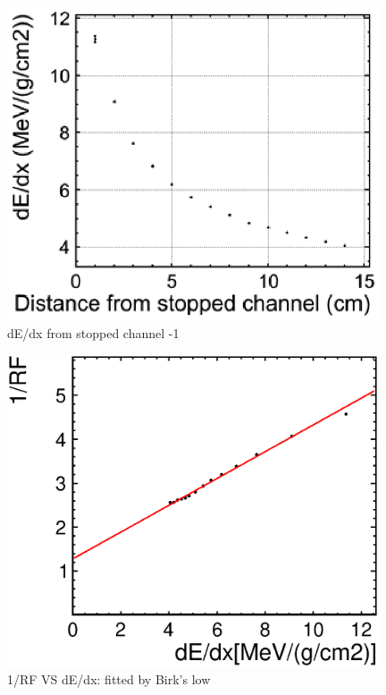 \begin{figure}[!htb]
  \centering
  \centering
  \includegraphics[width=11cm,clip]{./fig/dedx.eps}
  \caption{dE/dx from stopped channel -1}
  \label{fadcDistdEdx}
\end{figure}

\begin{figure}[!htb]
  \centering
  \centering
  \includegraphics[width=11cm,clip]{./fig/result.eps}
  \caption{1/RF VS dE/dx: fitted by Birk's low}
  \label{result}
\end{figure}

